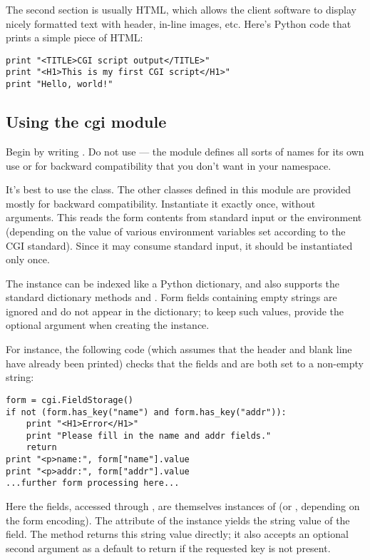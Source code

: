 The second section is usually HTML, which allows the client software
to display nicely formatted text with header, in-line images, etc.
Here's Python code that prints a simple piece of HTML:

\begin{verbatim}
print "<TITLE>CGI script output</TITLE>"
print "<H1>This is my first CGI script</H1>"
print "Hello, world!"
\end{verbatim}

\subsection{Using the cgi module}

Begin by writing .  Do not use  --- the module defines all sorts of names for its own use or for
backward compatibility that you don't want in your namespace.

It's best to use the  class.  The other classes
defined in this module are provided mostly for backward compatibility.
Instantiate it exactly once, without arguments.  This reads the form
contents from standard input or the environment (depending on the
value of various environment variables set according to the CGI
standard).  Since it may consume standard input, it should be
instantiated only once.

The  instance can be indexed like a Python
dictionary, and also supports the standard dictionary methods
 and .
Form fields containing empty strings are ignored
and do not appear in the dictionary; to keep such values, provide
the optional  argument when creating the
 instance.

For instance, the following code (which assumes that the 
 header and blank line have already been printed)
checks that the fields  and  are both set to a
non-empty string:

\begin{verbatim}
form = cgi.FieldStorage()
if not (form.has_key("name") and form.has_key("addr")):
    print "<H1>Error</H1>"
    print "Please fill in the name and addr fields."
    return
print "<p>name:", form["name"].value
print "<p>addr:", form["addr"].value
...further form processing here...
\end{verbatim}

Here the fields, accessed through , are
themselves instances of  (or
, depending on the form encoding).
The  attribute of the instance yields the string value
of the field.  The  method returns this string value
directly; it also accepts an optional second argument as a default to
return if the requested key is not present.

